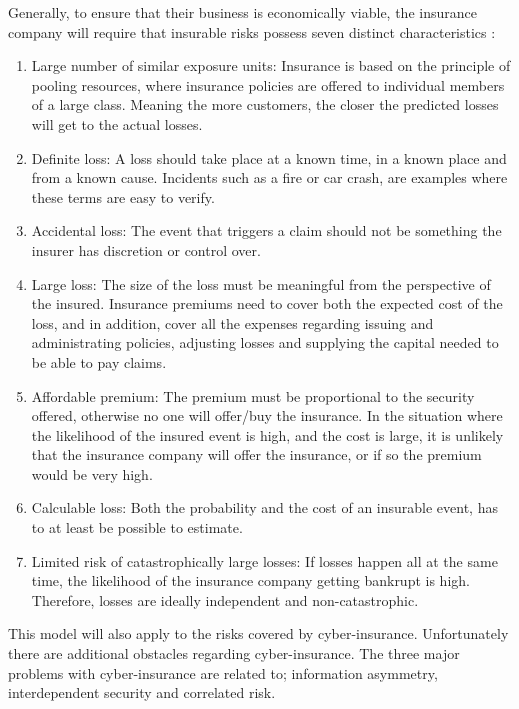 Generally, to ensure that their business is economically viable, the insurance company will require that insurable risks possess seven distinct characteristics \cite{mehr1980principles}: 
   \begin{enumerate}
   \item Large number of similar exposure units: Insurance is based on the principle of pooling resources, where insurance policies are offered to individual members of a large class. Meaning the more customers, the closer the predicted losses will get to the actual losses.
   \item Definite loss: A loss should take place at a known time, in a known place and from a known
    cause. Incidents such as a fire or car crash, are examples where these terms are easy to verify.
   \item Accidental loss: The event that triggers a claim should not be 
   something the insurer has discretion or control over.
   \item Large loss: The size of the loss must be meaningful from the perspective of the insured.
    Insurance premiums need to cover both the expected cost of the loss, and in addition, 
    cover all the expenses regarding issuing and administrating policies, adjusting losses and
     supplying the capital needed to be able to pay claims.
   \item Affordable premium: The premium must be proportional to the security offered, otherwise no one will offer/buy the insurance. In the situation where the likelihood of the insured event is high, and the cost is large, it is unlikely that the insurance company will offer the insurance, or if so the premium would be very high.
   \item Calculable loss: Both the probability and the cost of an insurable event,
    has to at least be possible to estimate. 
   \item Limited risk of catastrophically large losses: If losses happen all at the same time, the likelihood of
    the insurance company getting bankrupt is high. Therefore, losses are ideally independent and non-catastrophic. 
   \end{enumerate}
   
This model will also apply to the risks covered by cyber-insurance. Unfortunately there are additional obstacles regarding cyber-insurance. The three major problems with cyber-insurance are related to; information asymmetry, interdependent security and correlated risk. 
 
